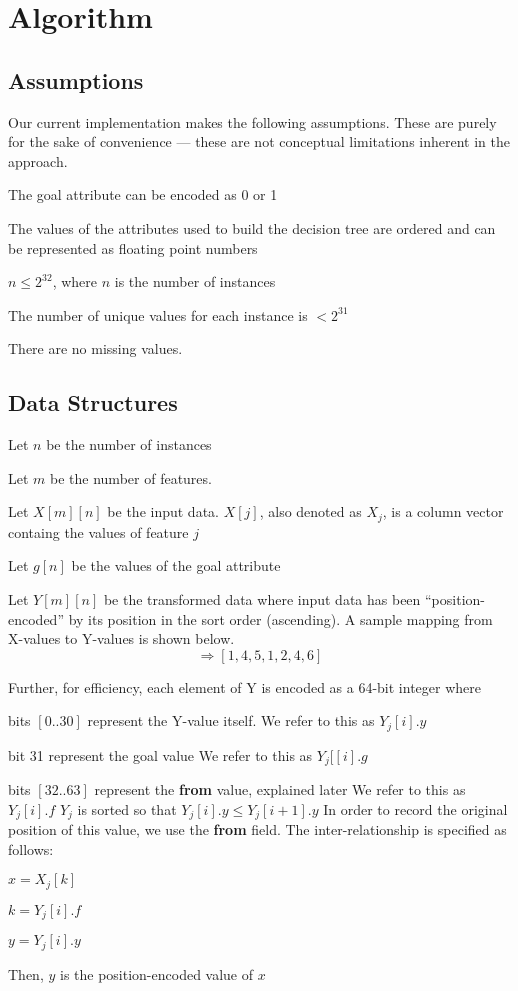 \documentclass[12pt,letterpaper]{article}
\begin{document}
\section{Algorithm}
\subsection{Assumptions}
Our current implementation makes the following assumptions. These are purely for
the sake of convenience --- these are not conceptual limitations inherent in
the approach.

\be
\item The goal attribute can be encoded as 0 or 1
\item The values of the attributes used to build the decision tree are ordered and can be
  represented as floating point numbers
\item \(n \leq 2^{32}\), where \(n\) is the number of instances
\item The number of unique values for each instance is \(< 2^{31}\)
\item There are no missing values. 
\ee

\subsection{Data Structures}

\be
\item Let \(n\) be the number of instances
\item Let \(m\) be the number of features. 
\item Let \(X[m][n]\) be the input data. \(X[j]\), also denoted as \(X_j\),  is a column vector containg
  the values of feature \(j\)
\item Let \(g[n]\) be the values of the goal attribute
\item Let \(Y[m][n]\) be the transformed data where input data has been
  ``position-encoded'' 
  by its position in the sort order (ascending). A sample mapping from 
  X-values to Y-values is shown below.
\begin{displaymath}
[11, 32, 47, 11, 17, 28, 32, 55] \Rightarrow [1, 4, 5, 1, 2, 4, 6]
\end{displaymath}

Further, for efficiency, each element of Y is encoded as a 64-bit integer where 
\bi
\item bits \([0..30]\) represent the Y-value itself. 
  We refer to this as \(Y_j[i].y\)
\item bit 31 represent the goal value
  We refer to this as \(Y_j[[i].g\)
\item bits \([32..63]\) represent the {\bf from} value, explained later
  We refer to this as \(Y_j[i].f\)
  \ei
\(Y_j\) is sorted so that \(Y_j[i].y \leq Y_j[i+1].y\)
In order to record the original position of this value, we use the {\bf from}
field. The inter-relationship is specified as follows:
\bi
\item \(x = X_j[k]\)
\item \(k = Y_j[i].f\)
\item \(y = Y_j[i].y\)
\item Then, \(y\) is the position-encoded value of \(x\)
  \ei
\end{document}
